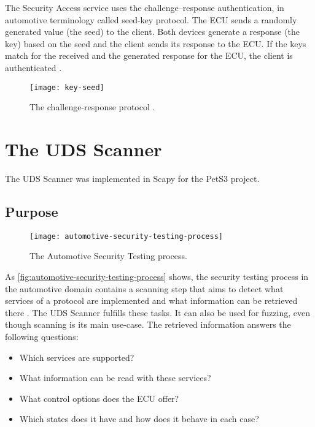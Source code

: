 The Security Access service uses the challenge–response authentication, in automotive terminology called seed-key protocol. The ECU sends a randomly generated value (the seed) to the client. Both devices generate a response (the key) based on the seed and the client sends its response to the ECU. If the keys match for the received and the generated response for the ECU, the client is authenticated \cite{iso14229}.

\begin{figure}[htb]
    \centering
    \texttt{[image: key-seed]}
    \caption{The challenge-response protocol \cite{Herrewegen2018}.}
    \label{fig:key-seed}
\end{figure}


\section{The UDS Scanner}

The UDS Scanner was implemented in Scapy for the PetS3 project.

\subsection{Purpose}

\begin{figure}[htb]
    \centering
    \texttt{[image: automotive-security-testing-process]}
    \caption{The Automotive Security Testing process.}
    \label{fig:automotive-security-testing-process}
\end{figure}

As \autoref{fig:automotive-security-testing-process} shows, the security testing process in the automotive domain contains a scanning step that aims to detect what services of a protocol are implemented and what information can be retrieved there \cite{Bayer2015}. The UDS Scanner fulfills these tasks. It can also be used for fuzzing, even though scanning is its main use-case. The retrieved information answers the following questions:

\begin{itemize}
\item Which services are supported?
\item What information can be read with these services?
\item What control options does the ECU offer?
\item Which states does it have and how does it behave in each case?
\end{itemize}


